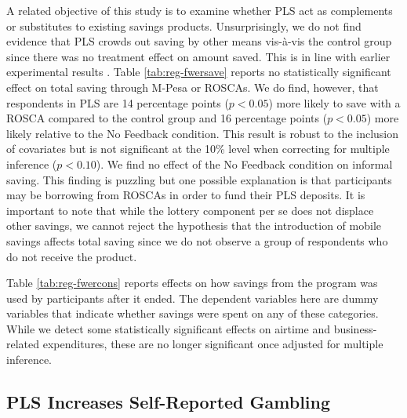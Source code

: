 \documentclass[12pt]{article}
\begin{document}
		A related objective of this study is to examine whether PLS act as complements or substitutes to existing savings products. Unsurprisingly, we do not find evidence that PLS crowds out saving by other means vis-\`{a}-vis the control group since there was no treatment effect on amount saved. This is in line with earlier experimental results \parencite{atalay_savings_2014,filiz-ozbay_lottery_2015,dizon_leveraging_2016}. Table \ref{tab:reg-fwersave} reports no statistically significant effect on total saving through M-Pesa or ROSCAs. We do find, however, that respondents in PLS are 14 percentage points ($p < 0.05$) more likely to save with a ROSCA compared to the control group and 16 percentage points ($p < 0.05$) more likely relative to the No Feedback condition. This result is robust to the inclusion of covariates but is not significant at the 10\% level when correcting for multiple inference ($p < 0.10$). We find no effect of the No Feedback condition on informal saving. This finding is puzzling but one possible explanation is that participants may be borrowing from ROSCAs in order to fund their PLS deposits. It is important to note that while the lottery component per se does not displace other savings, we cannot reject the hypothesis that the introduction of mobile savings affects total saving since we do not observe a group of respondents who do not receive the product.

		

		Table \ref{tab:reg-fwercons} reports effects on how savings from the program was used by participants after it ended. The dependent variables here are dummy variables that indicate whether savings were spent on any of these categories. While we detect some statistically significant effects on airtime and business-related expenditures, these are no longer significant once adjusted for multiple inference.

		

	\subsection{PLS Increases Self-Reported Gambling}
\end{document}
